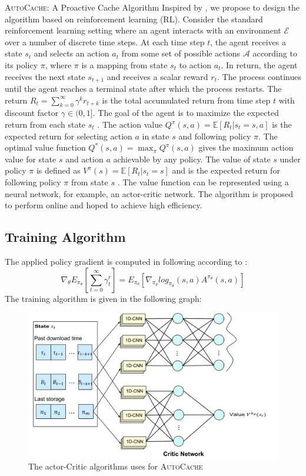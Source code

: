 \documentclass{article}
\begin{document}
\begin{section}{\textsc{AutoCache}: A Proactive Cache Algorithm}
    Inspired by \cite{Pensieve}, we propose to design the algorithm based on reinforcement learning (RL). Consider the standard reinforcement learning setting where an agent interacts with an environment $\mathcal{E}$ over a number of discrete time steps. At each time step $t$, the agent receives a state $s_t$ and selects an action $a_t$ from some set of possible actions $\mathcal{A}$ according to its policy $\pi$, where $\pi$ is a mapping from state $s_t$ to action $a_t$. In return, the agent receives the next state $s_{t+1}$ and receives a scalar reward $r_t$. The process continues until the agent reaches a terminal state after which the process restarts. The return $R_t=\sum_{k=0}^{\infty}\gamma^k r_{t+k}$ is the total accumulated return from time step $t$ with discount factor $\gamma\in(0,1]$. The goal of the agent is to maximize the expected return from each state $s_t$ \cite{rl-intro}. The action value $Q^{\pi}(s,a)=\mathbb{E}[R_t|s_t=s,a]$ is the expected return for selecting action $a$ in state $s$ and following policy $\pi$. The optimal value function $Q^*(s,a)=\max_{\pi}Q^{\pi}(s,a)$ gives the maximum action value for state $s$ and action $a$ achievable by any policy. The value of state $s$ under policy $\pi$ is defined as $V^{\pi}(s)=\mathbb{E}[R_t|s_t=s]$ and is the expected return for following policy $\pi$ from state $s$ \cite{DBLP:journals/corr/MnihBMGLHSK16}. The value function can be represented using a neural network, for example, an actor-critic network. The algorithm is proposed to perform online and hoped to achieve high efficiency.

    \subsection{Training Algorithm}
    The applied policy gradient is computed in following according to \cite{a3c}:
    $$
    \nabla_\theta E_{\pi_\theta}[\sum_{t=0}^{\infty} \gamma^ r_t] = E_{\pi_\theta} [\nabla_{\pi_\theta} log_{\pi_\theta}(s,a) A^{\pi_\theta}(s,a)]
    $$
    The training algorithm is given in the following graph:

    \begin{figure}[h]
        \label{fig:a3c}
        \centering
        \includegraphics[width=0.8\linewidth]{a3c-network.png}
        \caption{The actor-Critic algorithms uses for \textsc{AutoCache}}
    \end{figure}
    
\end{section}
\end{document}
